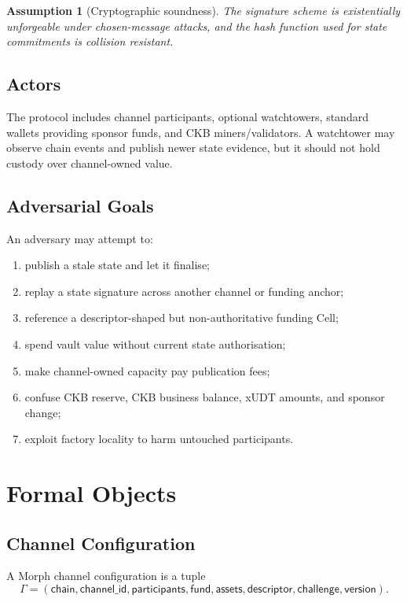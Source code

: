 \documentclass[a4paper,11pt]{article}
\newtheorem{assumption}{Assumption}
\begin{document}
\begin{assumption}[Cryptographic soundness]
The signature scheme is existentially unforgeable under chosen-message attacks, and the hash function used for state commitments is collision resistant.
\end{assumption}

\subsection{Actors}

The protocol includes channel participants, optional watchtowers, standard wallets providing sponsor funds, and CKB miners/validators. A watchtower may observe chain events and publish newer state evidence, but it should not hold custody over channel-owned value.

\subsection{Adversarial Goals}

An adversary may attempt to:
\begin{enumerate}[label=A\arabic*.]
  \item publish a stale state and let it finalise;
  \item replay a state signature across another channel or funding anchor;
  \item reference a descriptor-shaped but non-authoritative funding Cell;
  \item spend vault value without current state authorisation;
  \item make channel-owned capacity pay publication fees;
  \item confuse CKB reserve, CKB business balance, xUDT amounts, and sponsor change;
  \item exploit factory locality to harm untouched participants.
\end{enumerate}

\clearpage
\section{Formal Objects}

\subsection{Channel Configuration}

A Morph channel configuration is a tuple
\[
\Gamma =
(\mathsf{chain},\mathsf{channel\_id},\mathsf{participants},
\mathsf{fund},\mathsf{assets},\mathsf{descriptor},
\mathsf{challenge},\mathsf{version}).
\]
\end{document}
